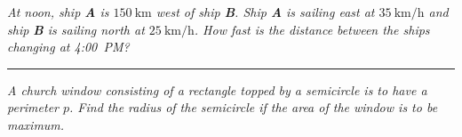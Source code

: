 \documentclass[12pt]{article}
\begin{document}
\bigskip
{\problem[15 pts] \em At noon, ship \textbf{A} is $150~\text{km}$ west
  of ship \textbf{B}.  Ship \textbf{A} is sailing east at
  $35~\text{km}/\text{h}$ and ship \textbf{B} is sailing north at
  $25~\text{km}/\text{h}$.  How fast is the distance between the ships
  changing at 4:00~PM?}
\vspace{7.5cm}
\begin{flushright}
\end{flushright}
\hrule
{\problem[15 pts] \em A church window consisting of a rectangle topped
  by a semicircle is to have a perimeter $p$.  Find the radius of the
  semicircle if the area of the window is to be maximum.} 
\vspace{8.5cm}
\begin{flushright}
\end{flushright}
\end{document}
